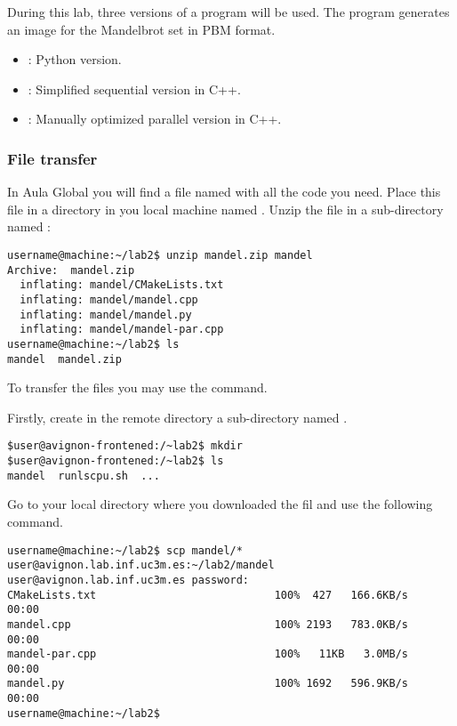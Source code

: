 During this lab, three versions of a program will be used.
The program generates an image for the Mandelbrot set in PBM format.

\begin{itemize}
  \item {}: Python version.
  \item {}: Simplified sequential version in C++.
  \item {}: Manually optimized parallel version in C++.
\end{itemize}

\subsubsection{File transfer}

In Aula Global you will find a file named  with all the code you need.
Place this file in a directory in you local machine named .
Unzip the file in a sub-directory named :

\begin{lstlisting}[style=terminal]
username@machine:~/lab2$ unzip mandel.zip mandel
Archive:  mandel.zip
  inflating: mandel/CMakeLists.txt   
  inflating: mandel/mandel.cpp       
  inflating: mandel/mandel.py        
  inflating: mandel/mandel-par.cpp   
username@machine:~/lab2$ ls
mandel  mandel.zip
\end{lstlisting}

To transfer the files you may use the  command.

Firstly, create in the remote directory a sub-directory named .

\begin{lstlisting}[style=terminal]
$user@avignon-frontened:/~lab2$ mkdir
$user@avignon-frontened:/~lab2$ ls
mandel  runlscpu.sh  ...
\end{lstlisting}

Go to your local directory where you downloaded the  fil and 
use the following command.

\begin{lstlisting}[style=terminal,basicstyle=\tiny\ttfamily,columns=fixed]
username@machine:~/lab2$ scp mandel/* user@avignon.lab.inf.uc3m.es:~/lab2/mandel
user@avignon.lab.inf.uc3m.es password: 
CMakeLists.txt                            100%  427   166.6KB/s   00:00    
mandel.cpp                                100% 2193   783.0KB/s   00:00    
mandel-par.cpp                            100%   11KB   3.0MB/s   00:00    
mandel.py                                 100% 1692   596.9KB/s   00:00    
username@machine:~/lab2$ 
\end{lstlisting}

